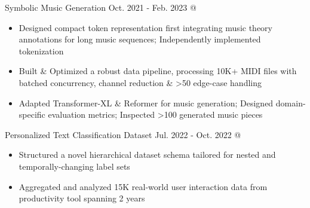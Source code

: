 \cveventSameLine{}
    {Symbolic Music Generation}
    {Oct. 2021 - Feb. 2023}{ @ }
\begin{itemize}


    \item Designed compact token representation first integrating music theory annotations for long music sequences;
    Independently implemented tokenization

    \item Built \& Optimized a robust data pipeline, processing 10K+ MIDI files with batched concurrency, channel reduction \& >50 edge-case handling

    \item Adapted Transformer-XL \& Reformer for music generation; Designed domain-specific evaluation metrics; Inspected >100 generated music pieces
\end{itemize}
\dividerSmall




\cveventSameLine{}
    {Personalized Text Classification Dataset}
    {Jul. 2022 - Oct. 2022}{ @ }
\begin{itemize}
    \item Structured a novel hierarchical dataset schema tailored for nested and temporally-changing label sets

    \item Aggregated and analyzed 15K real-world user interaction data from  productivity tool spanning 2 years

\end{itemize}
\dividerSmall




